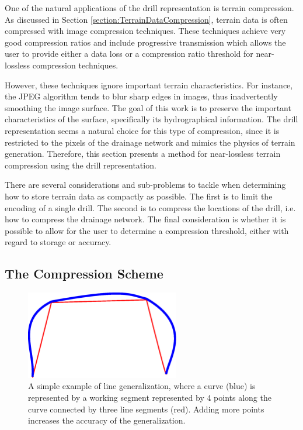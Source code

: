 One of the natural applications of the drill representation is terrain compression. 
As discussed in Section \ref{section:TerrainDataCompression}, terrain data is often compressed with image compression techniques. These techniques achieve very good compression ratios and include progressive transmission which allows the user to provide either a data loss or a compression ratio threshold for near-lossless compression techniques.

However, these techniques ignore important terrain characteristics. For instance, the JPEG algorithm tends to blur sharp edges in images, thus inadvertently smoothing the image surface. The goal of this work is to preserve the important characteristics of the surface, specifically its hydrographical information. The drill representation seems a natural choice for this type of compression, since it is restricted to the pixels of the drainage network and mimics the physics of terrain generation. Therefore, this section presents a method for near-lossless terrain compression using the drill representation.

There are several considerations and sub-problems to tackle when determining how to store terrain data as compactly as possible. The first is to limit the encoding of a single drill. The second is to compress the locations of the drill, i.e. how to compress the drainage network. The final consideration is whether it is possible to allow for the user to determine a compression threshold, either with regard to storage or accuracy.

\subsection{The Compression Scheme}
\label{section:CompressionScheme}

\begin{figure}[t]
  \centering
  \includegraphics[width=0.6\textwidth]{images/LineGeneralization.eps}
  \caption[A simple example of line generalization.]{\label{figure:LineGeneralization}A simple example of line generalization, where a curve (blue) is represented by a working segment represented by 4 points along the curve connected by three line segments (red). Adding more points increases the accuracy of the generalization.}
\end{figure}


